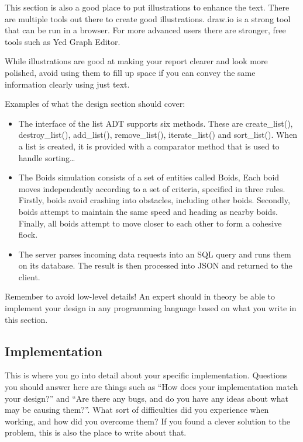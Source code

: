 \documentclass{article}
\begin{document}
\begin{flushleft}
\bigskip

This section is also a good place to put illustrations to enhance the text. 
There are multiple tools out there to create good illustrations. 
draw.io is a strong tool that can be run in a browser. For more advanced users there are stronger, free tools such as Yed Graph Editor.


\bigskip

While illustrations are good at making your report clearer and look more polished, avoid using them to fill up space if you can convey the same information clearly using just text.


\bigskip

Examples of what the design section should cover:

\begin{itemize}
\item The interface of the list ADT supports six methods. These are create\_list(), destroy\_list(), add\_list(), remove\_list(), iterate\_list() and sort\_list(). When a list is created, it is provided with a comparator method that is used to handle sorting{\dots}
\item The Boids simulation consists of a set of entities called Boids, Each boid moves independently according to a set of criteria, specified in three rules. Firstly, boids avoid crashing into obstacles, including other boids. Secondly, boids attempt to maintain the same speed and heading as nearby boids. Finally, all boids attempt to move closer to each other to form a cohesive flock.
\item The server parses incoming data requests into an SQL query and runs them on its database. The result is then processed into JSON and returned to the client.
\end{itemize}

\bigskip

Remember to avoid low-level details! An expert should in theory be able to implement your design in any programming language based on what you write in this section.

\subsection{Implementation}
This is where you go into detail about your specific implementation. Questions you should answer here are things such as ``How does your implementation match your design?'' and ``Are there any bugs, and do you have any ideas about what may be causing them?''. What sort of difficulties did you experience when working, and how did you overcome them? If you found a clever solution to the problem, this is also the place to write about that.


\end{flushleft}
\end{document}
